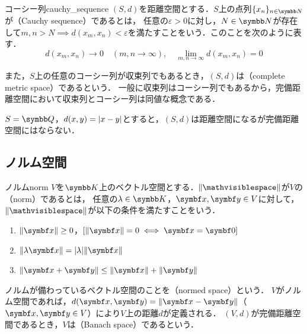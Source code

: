 \documentclass[../../main]{subfiles}
\begin{document}
\begin{definition}{コーシー列}{cauchy_sequence}
  \((S,d)\)を距離空間とする．\(S\)上の点列\(\seq{x_n}_{n\in\numset{N}}\)が（Cauchy sequence）であるとは，
  任意の\(\varepsilon>0\)に対し，\(N\in\numset{N}\)が存在して\(m,n>N\implies d(x_m,x_n)<\varepsilon\)を満たすことをいう．このことを次のように表す．
  \[
    d(x_m,x_n) \to 0\quad(m,n\to\infty),
    \quad\lim_{m,n\to\infty}d(x_m,x_n) = 0
  \]
\end{definition}

また，\(S\)上の任意のコーシー列が収束列でもあるとき，\((S,d)\)は（complete metric space）であるという．
一般に収束列はコーシー列でもあるから，完備距離空間において収束列とコーシー列は同値な概念である．

\begin{example}
  \(S=\numset{Q}\)，\(d(x,y)=\lvert x-y\rvert\)とすると，\((S,d)\)は距離空間になるが完備距離空間にはならない．
\end{example}

\subsection{ノルム空間}

\begin{definition}{ノルム}{norm}\index{\(\vnorm{\holder}\)}
  \(V\)を\(\numset{K}\)上のベクトル空間とする．\(\vnorm{\holder}\)が\(V\)の（norm）であるとは，
  任意の\(\lambda\in\numset{K}\)，\(\vect{x},\vect{y}\in V\)に対して，\(\vnorm{\holder}\)が以下の条件を満たすことをいう．
  \begin{enumerate}
    \item \(\vnorm{\vect{x}}\geq 0\)，\([\vnorm{\vect{x}}=0\iff\vect{x}=\zvec]\)
    \item \(\vnorm{\lambda\vect{x}}=\abs{\lambda}\vnorm{\vect{x}}\)
    \item \(\vnorm{\vect{x}+\vect{y}}\leq\vnorm{\vect{x}}+\vnorm{\vect{y}}\)
  \end{enumerate}
\end{definition}

ノルムが備わっているベクトル空間のことを（normed space）という．
\(V\)がノルム空間であれば，\(d(\vect{x},\vect{y})=\vnorm{\vect{x}-\vect{y}}\)（\(\vect{x},\vect{y}\in V\)）により\(V\)上の距離\(d\)が定義される．
\((V,d)\)が完備距離空間であるとき，\(V\)は（Banach space）であるという．
\end{document}
